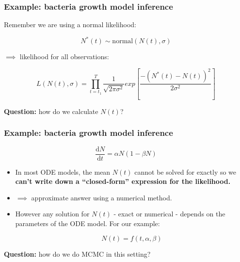 \documentclass[handout]{beamer}
\begin{document}
\begin{frame}
	\frametitle{Example: bacteria growth model inference}
	 Remember we are using a normal likelihood:
	
	\begin{equation}
	N^*(t) \sim \text{normal}(N(t), \sigma)
	\end{equation}
	
	$\implies$ likelihood for all observations:
	
	\begin{equation}
	L(N(t),\sigma) = \prod_{t={t_1}}^{T} \frac{1}{\sqrt{2\pi\sigma^2}} exp\left[\frac{-(N^*(t) - N(t))^2}{2\sigma^2}\right]
	\end{equation}
	
	\textbf{Question:} how do we calculate $N(t)$?
	
\end{frame}

\begin{frame}
	\frametitle{Example: bacteria growth model inference}
	
	\begin{equation}
	\frac{\mathrm{d}N}{\mathrm{d}t} = \alpha N (1-\beta N)
	\end{equation}
	
	\begin{itemize}
		\item<2-> In most ODE models, the mean $N(t)$ cannot be solved for exactly so we \textbf{can't write down a ``closed-form'' expression for the likelihood.}
		\item<3-> $\implies$ approximate answer using a numerical method.
		\item<4-> However any solution for $N(t)$ - exact or numerical - depends on the parameters of the ODE model. For our example:
		
		
		\begin{equation}
		N(t) = f(t,\alpha,\beta)
		\end{equation}
		
	\end{itemize}
	
	\vspace{0.2cm}
	
	\textbf{Question:} how do we do MCMC in this setting?
	
\end{frame}
\end{document}
